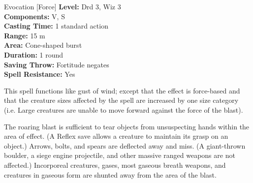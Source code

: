 {Evocation [Force]}
{
	\textbf{Level:}
	Drd 3, Wiz 3\\
	\textbf{Components:}
	V, S\\
	\textbf{Casting Time:}
	1 standard action\\
	\textbf{Range:}
	15 m\\
	\textbf{Area:}
	Cone-shaped burst\\
	\textbf{Duration:}
	1 round\\
	\textbf{Saving Throw:}
	Fortitude negates\\
	\textbf{Spell Resistance:}
	Yes\\
}
{
	This spell functions like gust of wind; except that the effect is force-based and that the creature sizes affected by the spell are increased by one size category (i.e. Large creatures are unable to move forward against the force of the blast).

	The roaring blast is sufficient to tear objects from unsuspecting hands within the area of effect. (A Reflex save allows a creature to maintain its grasp on an object.) Arrows, bolts, and spears are deflected away and miss. (A giant-thrown boulder, a siege engine projectile, and other massive ranged weapons are not affected.) Incorporeal creatures, gases, most gaseous breath weapons, and creatures in gaseous form are shunted away from the area of the blast.
}
